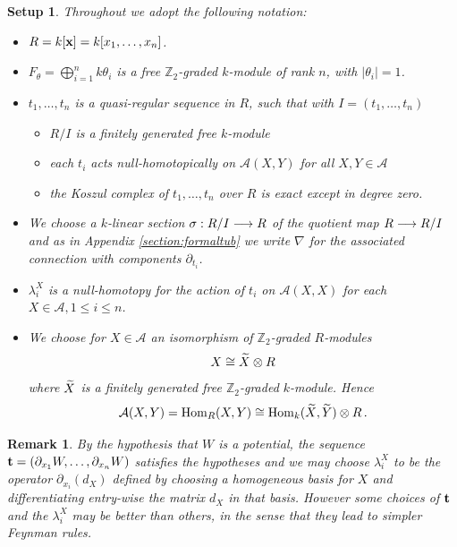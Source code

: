 \documentclass[english,letter paper,12pt,leqno]{article}
\newtheorem{setup}[theorem]{Setup}
\theoremstyle{example}
\newtheorem{remark}[theorem]{Remark}
\numberwithin{equation}{section}
\def\AA{\mathcal{A}}
\def\stab{\operatorname{stab}}
\def\Hom{\operatorname{Hom}}
\def\be{\begin{equation}}
\def\ee{\end{equation}}
\def\nZ{\mathds{Z}}
\begin{document}
\begin{setup}\label{setup:overall} Throughout we adopt the following notation:
\begin{itemize}
\item $R = k[\bold{x}] = k[x_1,\ldots,x_n]$.
\item $F_\theta = \bigoplus_{i=1}^n k\theta_i$ is a free $\mathbb{Z}_2$-graded $k$-module of rank $n$, with $|\theta_i| = 1$.
\item $t_1,\ldots,t_n$ is a quasi-regular sequence in $R$, such that with $I = (t_1,\ldots,t_n)$
\begin{itemize}
\item $R/I$ is a finitely generated free $k$-module
\item each $t_i$ acts null-homotopically on $\AA(X,Y)$ for all $X,Y \in \AA$
\item the Koszul complex of $t_1,\ldots,t_n$ over $R$ is exact except in degree zero.
\end{itemize}
\item We choose a $k$-linear section $\sigma: R/I \longrightarrow R$ of the quotient map $R \longrightarrow R/I$ and as in Appendix \ref{section:formaltub} we write $\nabla$ for the associated connection with components $\partial_{t_i}$.
\item $\lambda_i^X$ is a null-homotopy for the action of $t_i$ on $\AA(X,X)$ for each $X \in \AA, 1 \le i \le n$.
\item We choose for $X \in \AA$ an isomorphism of $\nZ_2$-graded $R$-modules
\[
X \cong \widetilde{X} \otimes R
\]
where $\widetilde{X}$ is a finitely generated free $\nZ_2$-graded $k$-module. Hence
\be
\AA(X,Y) = \Hom_R(X,Y) \cong \Hom_k(\coeff{X},\coeff{Y}) \otimes R\,.\label{eq:chosenCiso}
\ee
\end{itemize}
\end{setup}

\begin{remark} By the hypothesis that $W$ is a potential, the sequence $\bold{t} = (\partial_{x_1} W, \ldots, \partial_{x_n} W)$ satisfies the hypotheses and we may choose $\lambda_i^X$ to be the operator $\partial_{x_i}(d_X)$ defined by choosing a homogeneous basis for $X$ and differentiating entry-wise the matrix $d_X$ in that basis. However some choices of $\bold{t}$ and the $\lambda_i^X$ may be better than others, in the sense that they lead to simpler Feynman rules.%
\end{remark}
\end{document}
